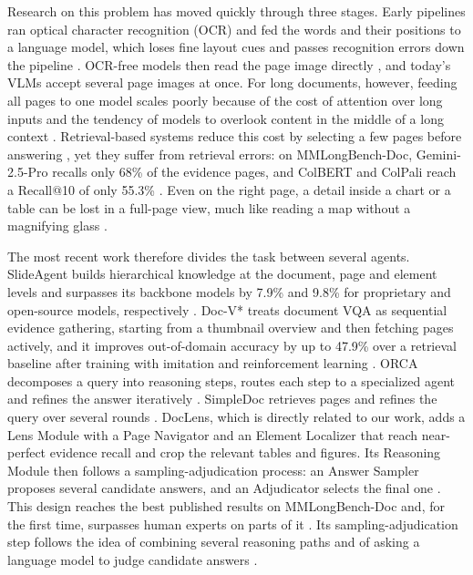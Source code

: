 Research on this problem has moved quickly through three stages. Early pipelines ran optical character recognition (OCR) and fed the words and their positions to a language model, which loses fine layout cues and passes recognition errors down the pipeline \cite{huang2022layoutlmv3}. OCR-free models then read the page image directly \cite{kim2022donut}, and today's VLMs accept several page images at once. For long documents, however, feeding all pages to one model scales poorly because of the cost of attention over long inputs and the tendency of models to overlook content in the middle of a long context \cite{ma2024mmlongbench,deng2025longdocurl}. Retrieval-based systems reduce this cost by selecting a few pages before answering \cite{santhanam2022colbertv2,faysse2024colpali,yu2024visrag,tanaka2025vdocrag}, yet they suffer from retrieval errors: on MMLongBench-Doc, Gemini-2.5-Pro recalls only 68\% of the evidence pages, and ColBERT and ColPali reach a Recall@10 of only 55.3\% \cite{zhu2025doclens}. Even on the right page, a detail inside a chart or a table can be lost in a full-page view, much like reading a map without a magnifying glass \cite{zhu2025doclens,slideagent}.

The most recent work therefore divides the task between several agents. SlideAgent builds hierarchical knowledge at the document, page and element levels and surpasses its backbone models by 7.9\% and 9.8\% for proprietary and open-source models, respectively \cite{slideagent}. Doc-V* treats document VQA as sequential evidence gathering, starting from a thumbnail overview and then fetching pages actively, and it improves out-of-domain accuracy by up to 47.9\% over a retrieval baseline after training with imitation and reinforcement learning \cite{docvstar}. ORCA decomposes a query into reasoning steps, routes each step to a specialized agent and refines the answer iteratively \cite{orca}. SimpleDoc retrieves pages and refines the query over several rounds \cite{jain2025simpledoc}. DocLens, which is directly related to our work, adds a Lens Module with a Page Navigator and an Element Localizer that reach near-perfect evidence recall and crop the relevant tables and figures. Its Reasoning Module then follows a sampling-adjudication process: an Answer Sampler proposes several candidate answers, and an Adjudicator selects the final one \cite{zhu2025doclens}. This design reaches the best published results on MMLongBench-Doc and, for the first time, surpasses human experts on parts of it \cite{zhu2025doclens}. Its sampling-adjudication step follows the idea of combining several reasoning paths \cite{wang2023selfconsistency,wei2022cot} and of asking a language model to judge candidate answers \cite{zheng2023judging}.

